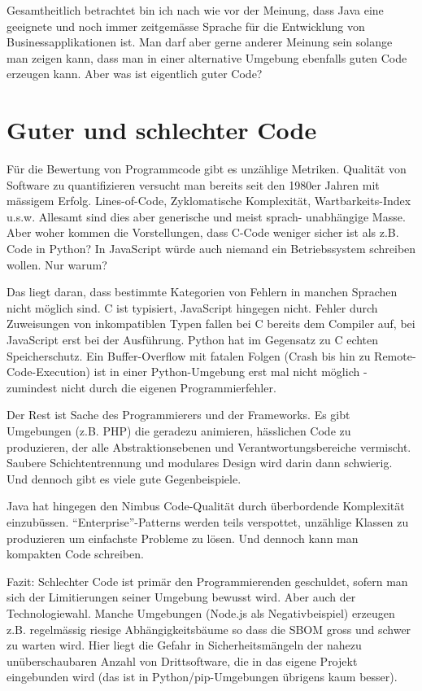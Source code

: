 Gesamtheitlich betrachtet bin ich nach wie vor der Meinung, dass Java eine
geeignete und noch immer zeitgemässe Sprache für die Entwicklung von
Businessapplikationen ist. Man darf aber gerne anderer Meinung sein solange
man zeigen kann, dass man in einer alternative Umgebung ebenfalls guten
Code erzeugen kann. Aber was ist eigentlich guter Code?

\section{Guter und schlechter Code}
Für die Bewertung von Programmcode gibt es unzählige Metriken. Qualität
von Software zu quantifizieren versucht man bereits seit den 1980er Jahren
mit mässigem Erfolg. Lines-of-Code, Zyklomatische Komplexität, 
Wartbarkeits-Index u.s.w. Allesamt sind dies aber generische und meist sprach-
unabhängige Masse. Aber woher kommen die Vorstellungen, dass C-Code weniger 
sicher ist als z.B. Code in Python? In JavaScript würde auch niemand ein
Betriebssystem schreiben wollen. Nur warum?

Das liegt daran, dass bestimmte Kategorien von Fehlern in manchen Sprachen
nicht möglich sind. C ist typisiert, JavaScript hingegen nicht. Fehler durch 
Zuweisungen von inkompatiblen Typen fallen bei C bereits dem Compiler auf, 
bei JavaScript erst bei der Ausführung. Python hat im Gegensatz zu C echten
Speicherschutz. Ein Buffer-Overflow mit fatalen Folgen (Crash bis hin zu 
Remote-Code-Execution) ist in einer Python-Umgebung erst mal nicht möglich 
- zumindest nicht durch die eigenen Programmierfehler.

Der Rest ist Sache des Programmierers und der Frameworks. Es gibt Umgebungen
(z.B. PHP) die geradezu animieren, hässlichen Code zu produzieren, der alle 
Abstraktionsebenen und Verantwortungsbereiche vermischt. Saubere 
Schichtentrennung und modulares Design wird darin dann schwierig. Und dennoch
gibt es viele gute Gegenbeispiele.

Java hat hingegen den Nimbus Code-Qualität durch überbordende Komplexität 
einzubüssen. ``Enterprise''-Patterns werden teils verspottet, unzählige Klassen 
zu produzieren um einfachste Probleme zu lösen. Und dennoch kann man kompakten
Code schreiben.

Fazit: Schlechter Code ist primär den Programmierenden geschuldet, sofern
man sich der Limitierungen seiner Umgebung bewusst wird. Aber auch der 
Technologiewahl. Manche Umgebungen (Node.js als Negativbeispiel) erzeugen z.B.
regelmässig riesige Abhängigkeitsbäume so dass die SBOM gross und schwer zu 
warten wird.
Hier liegt die Gefahr in Sicherheitsmängeln der nahezu unüberschaubaren Anzahl
von Drittsoftware, die in das eigene Projekt eingebunden wird (das ist in
Python/pip-Umgebungen übrigens kaum besser).

